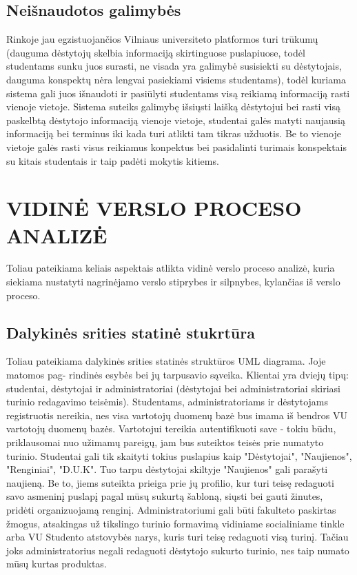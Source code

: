 \documentclass{VUMIFPSkursinis}
\begin{document}
\subsection{Neišnaudotos galimybės}
Rinkoje jau egzistuojančios Vilniaus universiteto platformos turi trūkumų (dauguma dėstytojų skelbia informaciją skirtinguose puslapiuose, todėl studentams sunku juos surasti, ne visada yra galimybė susisiekti su dėstytojais, dauguma konspektų nėra lengvai pasiekiami visiems studentams), todėl kuriama sistema gali juos išnaudoti ir pasiūlyti studentams visą reikiamą informaciją rasti vienoje vietoje. Sistema suteiks galimybę išsiųsti laišką dėstytojui bei rasti visą paskelbtą dėstytojo informaciją vienoje vietoje, studentai galės matyti naujausią informaciją bei terminus iki kada turi atlikti tam tikras užduotis. Be to vienoje vietoje galės rasti visus reikiamus konpektus bei pasidalinti turimais konspektais su kitais studentais ir taip padėti mokytis kitiems.
\newpage
\section{VIDINĖ VERSLO PROCESO ANALIZĖ}
Toliau pateikiama keliais aspektais atlikta vidinė verslo proceso analizė, kuria siekiama
nustatyti nagrinėjamo verslo stiprybes ir silpnybes, kylančias iš verslo proceso.
\subsection{Dalykinės srities statinė stukrtūra}
 Toliau pateikiama dalykinės srities statinės struktūros UML diagrama. Joje matomos pag-
rindinės esybės bei jų tarpusavio sąveika. Klientai yra dviejų tipų: studentai, dėstytojai ir administratoriai (dėstytojai bei administratoriai skiriasi turinio redagavimo teisėmis). Studentams, administratoriams ir dėstytojams registruotis nereikia, nes visa vartotojų duomenų bazė bus imama iš bendros VU vartotojų duomenų bazės. Vartotojui tereikia autentifikuoti save - tokiu būdu, priklausomai nuo užimamų pareigų, jam bus suteiktos teisės prie numatyto turinio. Studentai gali tik skaityti tokius puslapius kaip "Dėstytojai", "Naujienos", "Renginiai", "D.U.K". Tuo tarpu dėstytojai skiltyje "Naujienos" gali parašyti naujieną. Be to, jiems suteikta prieiga prie jų profilio, kur turi teisę redaguoti savo asmeninį puslapį pagal mūsų sukurtą šabloną, siųsti bei gauti žinutes, pridėti organizuojamą renginį. Administratoriumi gali būti fakulteto paskirtas žmogus, atsakingas už tikslingo turinio formavimą vidiniame socialiniame tinkle arba VU Studento atstovybės narys, kuris turi teisę redaguoti visą turinį. Tačiau joks administratorius negali redaguoti dėstytojo sukurto turinio, nes taip numato mūsų kurtas produktas.\\
\end{document}
